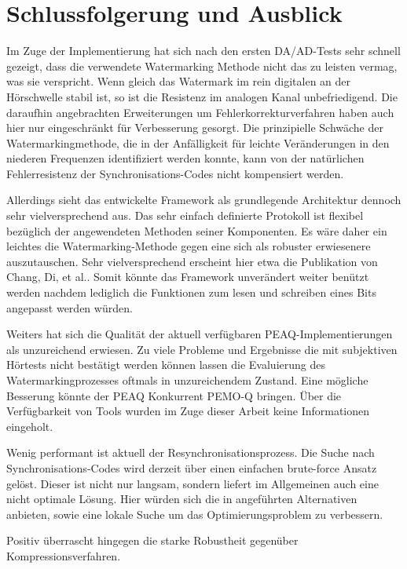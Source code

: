 \chapter{Schlussfolgerung und Ausblick}
\label{ch:ausblick}

Im Zuge der Implementierung hat sich nach den ersten DA/AD-Tests sehr schnell gezeigt, dass die verwendete Watermarking Methode\cite{xiang2007robust} nicht das zu leisten vermag, was sie verspricht. Wenn gleich das Watermark im rein digitalen an der Hörschwelle stabil ist, so ist die Resistenz im analogen Kanal unbefriedigend. Die daraufhin angebrachten Erweiterungen um Fehlerkorrekturverfahren haben auch hier nur eingeschränkt für Verbesserung gesorgt. Die prinzipielle Schwäche der Watermarkingmethode, die in der Anfälligkeit für leichte Veränderungen in den niederen Frequenzen identifiziert werden konnte, kann von der natürlichen Fehlerresistenz der Synchronisations-Codes nicht kompensiert werden.

Allerdings sieht das entwickelte Framework als grundlegende Architektur dennoch sehr vielversprechend aus. Das sehr einfach definierte Protokoll ist flexibel bezüglich der angewendeten Methoden seiner Komponenten. Es wäre daher ein leichtes die Watermarking-Methode gegen eine sich als robuster erwiesenere auszutauschen. Sehr vielversprechend erscheint hier etwa die Publikation von Chang, Di, et al.\cite{chang2012location}. Somit könnte das Framework unverändert weiter benützt werden nachdem lediglich die Funktionen zum lesen und schreiben eines Bits angepasst werden würden. 

Weiters hat sich die Qualität der aktuell verfügbaren PEAQ-Implementierungen als unzureichend erwiesen. Zu viele Probleme und Ergebnisse die mit subjektiven Hörtests nicht bestätigt werden können lassen die Evaluierung des Watermarkingprozesses oftmals in unzureichendem Zustand. Eine mögliche Besserung könnte der PEAQ Konkurrent PEMO-Q\cite{huber2006pemo} bringen. Über die Verfügbarkeit von Tools wurden im Zuge dieser Arbeit keine Informationen eingeholt. 

Wenig performant ist aktuell der Re\-synchron\-isations\-prozess. Die Suche nach Synchron\-isations-Codes wird derzeit über einen einfachen brute-force Ansatz gelöst. Dieser ist nicht nur langsam, sondern liefert im Allgemeinen auch eine nicht optimale Lösung. Hier würden sich die in \cite{steinebach2011re} angeführten Alternativen anbieten, sowie eine lokale Suche um das Optimierungs\-problem zu verbessern. 

Positiv überrascht hingegen die starke Robustheit gegenüber Kompressionsverfahren.
